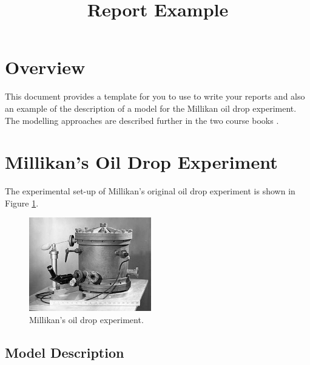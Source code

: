 \documentclass[10pt, twocolumn, a4paper]{article}
\title{Report Example}
\author{
    \authorstyle{Alex Rogers, 29th October 2020}
}
\date{}
\begin{document}
\maketitle  

\setcounter{page}{1}

\thispagestyle{firstpage}  


\section{Overview}

This document provides a template for you to use to write your reports and also an example of the description of a model for the Millikan oil drop experiment. The modelling approaches are described further in the two course books \citep{bayesian_hackers, bayesian_analysis}.

\section{Millikan's Oil Drop Experiment}

The experimental set-up of Millikan's original oil drop experiment is shown in Figure \ref{experiment}.

\begin{figure}[htp]
\begin{center}
\includegraphics[width=0.475\textwidth]{./figures/experiment.jpg}
\caption{Millikan's oil drop experiment.}
\label{experiment}
\end{center}
\end{figure}

\subsection{Model Description}
\end{document}
